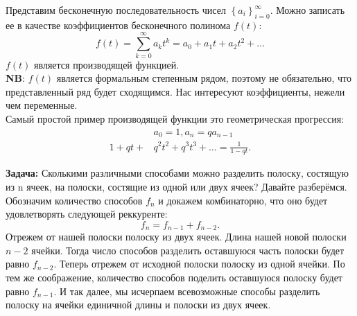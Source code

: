 \documentclass[a0paper,portrait]{baposter}
\begin{document}
\begin{poster}


{\small{Представим бесконечную последовательность чисел $\left\{a_i\right\}_{i=0}^\infty$. Можно записать ее
в качестве коэффициентов бесконечного полинома $f(t)$:
\[
	f(t) = \sum_{k=0}^{\infty} a_kt^k = a_0 + a_1t + a_2t^2 + \ldots
\]
$f(t)$ является производящей функцией. \\
\textbf{NB}: $f(t)$ является формальным степенным рядом, поэтому не обязательно, что представленный
ряд будет сходящимся. Нас интересуют коэффициенты, нежели чем переменные. \\
Самый простой пример производящей функции это геометрическая прогрессия:
\begin{align*}
	&a_0 = 1, a_n = qa_{n-1} \\
	1 + qt + &q^2t^2 + q^3t^3 + \ldots = \frac{1}{1 - qt}
.\end{align*}
}
}
{
\small{
\textbf{Задача:} Сколькими различными способами можно разделить полоску, состящую из n ячеек, на полоски, состящие из одной или двух ячеек? 
Давайте разберёмся. 
Обозначим количество способов $f_n$ и докажем комбинаторно, что оно будет удовлетворять следующей реккуренте:
\[
	f_n = f_{n - 1} + f_{n - 2}
.\]
Отрежем от нашей полоски полоску из двух ячеек. 
Длина нашей новой полоски $n - 2$ ячейки.
Тогда число способов разделить оставшуюся часть полоски будет равно $f_{n - 2}$.
Теперь отрежем от исходной полоски полоску из одной ячейки.
По тем же соображение, количество способов поделить оставшуюся полоску будет равно $f_{n - 1}$.
И так далее, мы исчерпаем всевозможные способы разделить полоску на ячейки единичной длины и полоски из двух ячеек.

}}
\end{poster}
\end{document}
